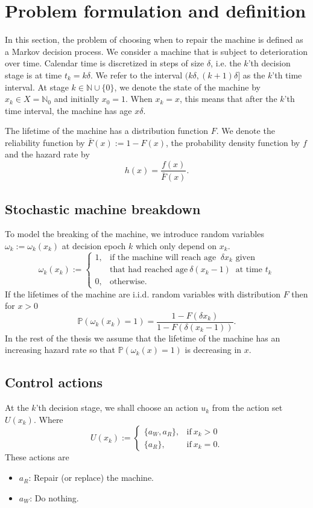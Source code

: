 \section{Problem formulation and definition}\label{section:AgeBasedDefinition}
In this section, the problem of choosing when to repair the machine is defined as a Markov decision process.
We consider a machine that is subject to deterioration over time.
Calendar time is discretized in steps of size $\delta$, i.e. the $k$'th decision stage is at time $t_k=k\delta$.
We refer to the interval $(k\delta,(k+1)\delta]$ as the $k$'th time interval.
At stage $k\in\mathbb{N}\cup\{0\}$, we denote the state of the machine by $x_k\in X=\mathbb{N}_0$ and initially $x_0=1$.
When $x_k=x$, this means that after the $k$'th time interval, the machine has age $x\delta$.

The lifetime of the machine has a distribution function $F$.
We denote the reliability function by $\bar F(x):=1-F(x)$, the probability density function by $f$ and the hazard rate by 
\[
h(x)=\frac{f(x)}{\bar F(x)}.
\] 

\subsection{Stochastic machine breakdown}
To model the breaking of the machine, we introduce random variables $\omega_k:=\omega_k(x_k)$ at decision epoch $k$ which only depend on $x_k$.
$$
\omega_k(x_k):=\begin{cases}
1,&\text{if the machine will reach age }\ \delta x_{k}\text{ given}\\
&\text{that had reached age}\ \delta(x_k-1)\ \text{ at time } t_k \\
0,&\text{otherwise}.
\end{cases}
$$
If the lifetimes of the machine are i.i.d. random variables with distribution $F$ then for $x>0$
$$
\mathbb{P}(\omega_k(x_k)=1)=\frac{1-F(\delta x_k)}{1-F(\delta (x_k-1))}.
$$
In the rest of the thesis we assume that the lifetime of the machine has an increasing hazard rate so that $\mathbb{P}(\omega_k(x)=1)$ is decreasing in $x$.

\subsection{Control actions}
At the $k$'th decision stage, we shall choose an action $u_k$ from the action set $U(x_k)$.
Where
$$
U(x_k):=\begin{cases}
\{a_W,a_R\},&\text{if}\ x_k>0 \\
\{a_R\},&\text{if}\ x_k=0.
\end{cases}
$$
These actions are
\begin{itemize}
	\item $a_R$:
	Repair (or replace) the machine.
	\item $a_W$:
	Do nothing.
\end{itemize}

